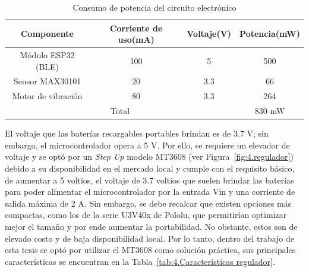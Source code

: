 \begin{table}[H]
\centering
\caption{Consumo de potencia  del circuito electrónico}
\label{tab:4.Consumo corrientes}
\begin{tabular}{|c|c|c|c|} 
\hline
Componente         & Corriente de uso(mA) & Voltaje(V) & Potencia(mW)  \\ 
\hline
Módulo ESP32 (BLE) & 100                  & 5          & 500           \\ 
\hline
Sensor MAX30101    & 20                   & 3.3        & 66            \\ 
\hline
Motor de vibración & 80                   & 3.3        & 264           \\ 
\hline
\multicolumn{3}{|c|}{Total}                            & 830 mW        \\
\hline
\end{tabular}
\end{table}

El voltaje que las baterías recargables portables brindan es de 3.7 V; sin embargo, el microcontrolador opera a 5 V. Por ello, se requiere un elevador de voltaje y se optó por un \textit{Step Up} modelo MT3608 (ver Figura~\ref{fig:4.regulador}) debido a su disponibilidad en el mercado local y cumple con el requisito básico, de aumentar a 5 voltios, el voltaje de 3.7 voltios que suelen brindar las baterías para poder alimentar el microcontrolador por la entrada Vin y una corriente de salida máxima de 2 A. Sin embargo, se debe recalcar que existen opciones más compactas, como los de la serie U3V40x de Pololu, que permitirían optimizar mejor el tamaño y por ende aumentar la portabilidad. No obstante, estos son de elevado costo y de baja disponibilidad local. Por lo tanto, dentro del trabajo de esta tesis se optó por utilizar el MT3608 como solución práctica, sus principales características se encuentran en la  Tabla~\ref{tab:4.Caracteristicas regulador}.

 



